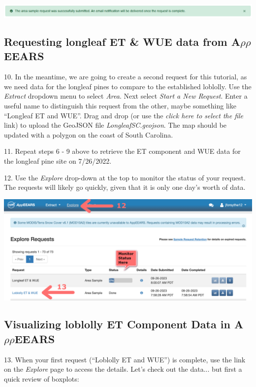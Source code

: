 \documentclass[oneside,a4paper,11pt,explicit]{book}
\begin{document}
\vspace{.5em}

\centerline{\includegraphics[width=\textwidth]{RequestSuccess.png}}

\subsection{Requesting longleaf ET \& WUE data from A$\rho\rho$EEARS}

10. In the meantime, we are going to create a second request for this tutorial, as we need data for the longleaf pines to compare to the established loblolly. Use the \textit{Extract} dropdown menu to select \textit{Area}. Next select \textit{Start a New Request}.  Enter a useful name to distinguish this request from the other, maybe something like ``Longleaf ET and WUE''. Drag and drop (or use the \textit{click here to select the file} link) to upload the GeoJSON file \textit{LongleafSC.geojson}. The map should be updated with a polygon on the coast of South Carolina.

11. Repeat steps 6 - 9 above to retrieve the ET component and WUE data for the longleaf pine site on 7/26/2022.

12. Use the \textit{Explore} drop-down at the top to monitor the status of your request. The requests will likely go quickly, given that it is only one day's worth of data.

\vspace{.5em}

\centerline{\includegraphics[width=.55\textwidth]{ExploreComplete.png}}

\vspace{.5em}

\subsection{Visualizing loblolly ET Component Data in A$\rho\rho$EEARS}

13. When your first request (``Loblolly ET and WUE'') is complete, use the link on the \textit{Explore} page to access the details. Let's check out the data... but first a quick review of boxplots:
\end{document}
